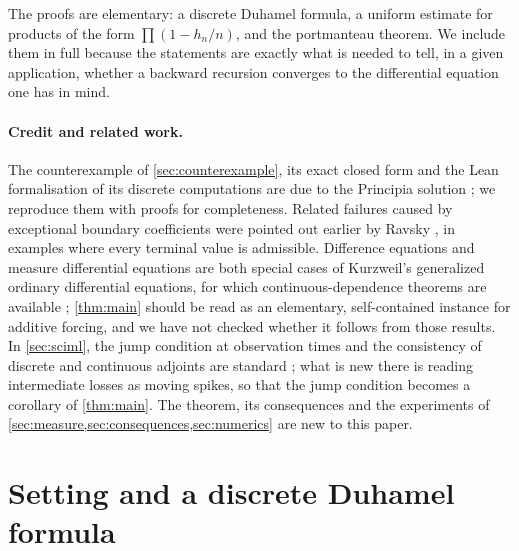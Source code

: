 \documentclass[11pt]{article}
\theoremstyle{definition}
\theoremstyle{remark}
\newcommand{\1}{\mathbf{1}}
\begin{document}
The proofs are elementary: a discrete Duhamel formula, a uniform estimate for products of
the form $\prod(1-h_n/n)$, and the portmanteau theorem. We include them in full because the
statements are exactly what is needed to tell, in a given application, whether a backward
recursion converges to the differential equation one has in mind.

\paragraph{Credit and related work.} The counterexample of \cref{sec:counterexample}, its exact
closed form and the Lean formalisation of its discrete computations are due to the Principia
solution \cite{Pri26,PriLean}; we reproduce them with proofs for completeness. Related failures
caused by exceptional boundary coefficients were pointed out earlier by Ravsky \cite{Rav24}, in
examples where every terminal value is admissible. Difference equations and measure differential
equations are both special cases of Kurzweil's generalized ordinary differential equations, for
which continuous-dependence theorems are available \cite{Sch92,MST19}; \cref{thm:main} should be
read as an elementary, self-contained instance for additive forcing, and we have not checked
whether it follows from those results. In \cref{sec:sciml}, the jump condition at observation
times and the consistency of discrete and continuous adjoints are standard
\cite{CRBD18,Hag00,SS16,GKB19}; what is new there is reading intermediate losses as moving spikes,
so that the jump condition becomes a corollary of \cref{thm:main}. The theorem, its consequences
and the experiments of \cref{sec:measure,sec:consequences,sec:numerics} are new to this paper.

\section{Setting and a discrete Duhamel formula}\label{sec:setting}
\end{document}
